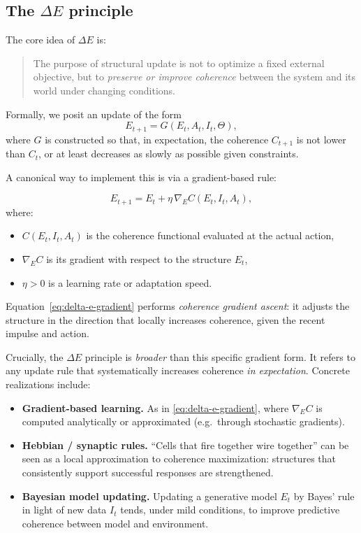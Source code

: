 \documentclass[12pt,a4paper]{report}
\begin{document}
\subsection*{The $\Delta E$ principle}

The core idea of $\Delta E$ is:

\begin{quote}
The purpose of structural update is not to optimize a fixed external objective, but to \emph{preserve or improve coherence} between the system and its world under changing conditions.
\end{quote}

Formally, we posit an update of the form
\[
    E_{t+1} = G(E_t, A_t, I_t, \Theta),
\]
where \(G\) is constructed so that, in expectation, the coherence \(C_{t+1}\) is not lower than \(C_t\), or at least decreases as slowly as possible given constraints.

A canonical way to implement this is via a gradient-based rule:

\begin{equation}
    E_{t+1} = E_t + \eta \, \nabla_{E} C(E_t, I_t, A_t),
    \label{eq:delta-e-gradient}
\end{equation}
where:

\begin{itemize}[leftmargin=2em]
    \item \(C(E_t, I_t, A_t)\) is the coherence functional evaluated at the actual action,
    \item \(\nabla_E C\) is its gradient with respect to the structure \(E_t\),
    \item \(\eta > 0\) is a learning rate or adaptation speed.
\end{itemize}

Equation~\eqref{eq:delta-e-gradient} performs \emph{coherence gradient ascent}: it adjusts the structure in the direction that locally increases coherence, given the recent impulse and action.

Crucially, the \(\Delta E\) principle is \emph{broader} than this specific gradient form. It refers to any update rule that systematically increases coherence \emph{in expectation}. Concrete realizations include:

\begin{itemize}[leftmargin=2em]
    \item \textbf{Gradient-based learning.} As in \eqref{eq:delta-e-gradient}, where \(\nabla_E C\) is computed analytically or approximated (e.g.\ through stochastic gradients).
    \item \textbf{Hebbian / synaptic rules.} ``Cells that fire together wire together'' can be seen as a local approximation to coherence maximization: structures that consistently support successful responses are strengthened.
    \item \textbf{Bayesian model updating.} Updating a generative model \(E_t\) by Bayes' rule in light of new data \(I_t\) tends, under mild conditions, to improve predictive coherence between model and environment.
\end{itemize}
\end{document}

